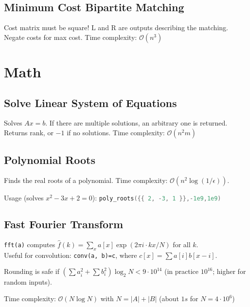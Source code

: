 \documentclass{article}
\begin{document}
\pagebreak

\subsection*{Minimum Cost Bipartite Matching}
Cost matrix must be square! L and R are outputs describing the matching. Negate costs for max cost. Time complexity: $\mathcal{O}(n^3)$


\section*{Math}

\subsection*{Solve Linear System of Equations}
Solves $A x = b$. If there are multiple solutions, an arbitrary one is returned.
Returns rank, or $-1$ if no solutions. Time complexity: $\mathcal{O}(n^2 m)$



\subsection*{Polynomial Roots}

Finds the real roots of a polynomial. Time complexity: $\mathcal{O}(n^2 \log(1/\epsilon))$.

Usage (solves $x^2-3x+2 = 0$): \lstinline[language=C++]|poly_roots({{ 2, -3, 1 }},-1e9,1e9)|




\subsection*{Fast Fourier Transform}
\lstinline{fft(a)} computes $\hat f(k) = \sum_x a[x] \exp(2\pi i \cdot k x / N)$ for all $k$.\\
Useful for convolution: \lstinline{conv(a, b)=c}, where $c[x] = \sum a[i]b[x-i]$.

Rounding is safe if $(\sum a_i^2 + \sum b_i^2)\log_2{N} < 9\cdot10^{14}$
(in practice $10^{16}$; higher for random inputs).

Time complexity: $\mathcal{O}(N \log N)$ with $N = |A|+|B|$ (about $1s$ for $N=4 \cdot 10^6$)


\pagebreak
\end{document}
